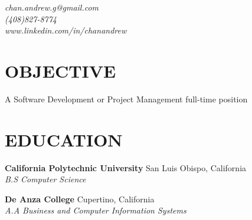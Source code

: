 \documentclass[margin,line]{resume}
\begin{document}
\fontsize{9.5pt}{9.5pt}\selectfont
\def \identsize {12mm}

{
  \sc
    \hfill {\infosize\textsl{chan.andrew.g@gmail.com}}          \\\vspace{0mm}
    \hfill {\infosize\textsl{(408)827-8774}}                    \\\vspace{0mm}
    \hfill {\infosize\textsl{www.linkedin.com/in/chanandrew}}   \\\vspace{-10mm}
}

\begin{resume}

\vspace{1mm}

    \section{\mysidestyle \textbf{\large{O}\small{BJECTIVE}}}

    A Software Development or Project Management full-time position

\sectionline

    \section{\mysidestyle \textbf{\large{E}\small{DUCATION}}}

    \textbf{\listing California Polytechnic University} \hfill San Luis Obispo, California\\
    \hspace*{\identsize} \textsl{B.S Computer Science} \vspace{-2.5mm}
    
    \textbf{\listing De Anza College} \hfill Cupertino, California\\
    \hspace*{\identsize} \textsl{A.A Business and Computer Information Systems}

\sectionline


\end{resume}
\end{document}
